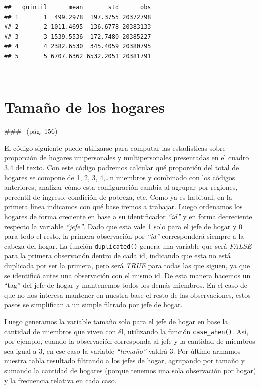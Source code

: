 \documentclass[
]{book}
\begin{document}
\begin{verbatim}
##   quintil      mean       std      obs
## 1       1  499.2978  197.3755 20372798
## 2       2 1011.4695  136.6778 20383133
## 3       3 1539.5536  172.7480 20385227
## 4       4 2382.6530  345.4059 20380795
## 5       5 6707.6362 6532.2051 20381791
\end{verbatim}

~

\hypertarget{tamauxf1o-de-los-hogares}{%
\section{Tamaño de los hogares}\label{tamauxf1o-de-los-hogares}}

\#\#\#- (pág. 156)

El código siguiente puede utilizarse para computar las estadísticas sobre proporción de hogares unipersonales y multipersonales presentadas en el cuadro 3.4 del texto. Con este código podremos calcular qué proporción del total de hogares se compone de 1, 2, 3, 4,\ldots n miembros y combinado con los códigos anteriores, analizar cómo esta configuración cambia al agrupar por regiones, percentil de ingreso, condición de pobreza, etc. Como ya es habitual, en la primera línea indicamos con qué base iremos a trabajar. Luego ordenamos los hogares de forma creciente en base a su identificador \emph{``id''} y en forma decreciente respecto la variable \emph{``jefe''}. Dado que esta vale 1 solo para el jefe de hogar y 0 para todo el resto, la primera observación por \emph{``id''} corresponderá siempre a la cabeza del hogar. La función \texttt{duplicated()} genera una variable que será \emph{FALSE} para la primera observación dentro de cada id, indicando que esta no está duplicada por ser la primera, pero será \emph{TRUE} para todas las que siguen, ya que se identificó antes una observación con el mismo id. De esta manera hacemos un ``tag'' del jefe de hogar y mantenemos todos los demás miembros. En el caso de que no nos interesa mantener en nuestra base el resto de las observaciones, estos pasos se simplifican a un simple filtrado por jefe de hogar.

Luego generamos la variable tamaño solo para el jefe de hogar en base la cantidad de miembros que viven con él, utilizando la función \texttt{case\_when()}. Así, por ejemplo, cuando la observación corresponda al jefe y la cantidad de miembros sea igual a 3, en ese caso la variable \emph{``tamaño''} valdrá 3. Por último armamos nuestra tabla resultado filtrando a los jefes de hogar, agrupando por tamaño y sumando la cantidad de hogares (porque tenemos una sola observación por hogar) y la frecuencia relativa en cada caso.
\end{document}
